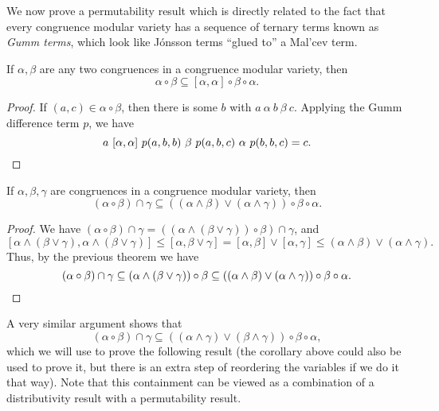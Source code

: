\documentclass[letterpaper,11pt]{article}
\begin{document}
We now prove a permutability result which is directly related to the fact that every congruence modular variety has a sequence of ternary terms known as \emph{Gumm terms}, which look like J\'onsson terms ``glued to'' a Mal'cev term.

\begin{thm}\label{commutator-permute} If $\alpha, \beta$ are any two congruences in a congruence modular variety, then
\[
\alpha \circ \beta \subseteq [\alpha,\alpha] \circ \beta \circ \alpha.
\]
\end{thm}
\begin{proof} If $(a,c) \in \alpha \circ \beta$, then there is some $b$ with $a\ \alpha\ b\ \beta\ c$. Applying the Gumm difference term $p$, we have
\[
a\ [\alpha,\alpha]\ p(a,b,b)\ \beta\ p(a,b,c)\ \alpha\ p(b,b,c) = c.\qedhere
\]
\end{proof}

\begin{cor} If $\alpha, \beta, \gamma$ are congruences in a congruence modular variety, then
\[
(\alpha \circ \beta) \cap \gamma \subseteq ((\alpha \wedge \beta)\vee (\alpha \wedge \gamma))\circ \beta \circ \alpha.
\]
\end{cor}
\begin{proof} We have $(\alpha \circ \beta) \cap \gamma = ((\alpha \wedge (\beta\vee \gamma))\circ \beta) \cap \gamma$, and
\[
[\alpha \wedge (\beta\vee \gamma),\alpha \wedge (\beta \vee \gamma)] \le [\alpha, \beta \vee \gamma] = [\alpha, \beta] \vee [\alpha, \gamma] \le (\alpha \wedge \beta) \vee (\alpha \wedge \gamma).
\]
Thus, by the previous theorem we have
\[
(\alpha \circ \beta) \cap \gamma \subseteq (\alpha \wedge (\beta\vee \gamma))\circ \beta \subseteq ((\alpha \wedge \beta)\vee (\alpha \wedge \gamma))\circ \beta \circ \alpha.\qedhere
\]
\end{proof}

A very similar argument shows that
\[
(\alpha \circ \beta) \cap \gamma \subseteq ((\alpha \wedge \gamma)\vee (\beta \wedge \gamma))\circ \beta \circ \alpha,
\]
which we will use to prove the following result (the corollary above could also be used to prove it, but there is an extra step of reordering the variables if we do it that way). Note that this containment can be viewed as a combination of a distributivity result with a permutability result.
\end{document}
